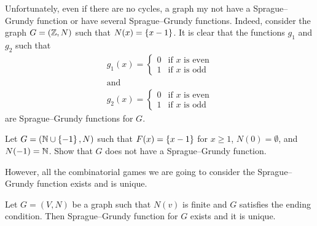Unfortunately, even if there are no cycles, a graph my not have a
Sprague--Grundy function or have several Sprague--Grundy functions. Indeed,
consider the graph $G = ({\mathbb{Z}}, N)$ such that $N(x) = \set{x - 1}$. It is clear
that the functions $g_1$ and $g_2$ such that
\begin{gather*}
    g_1(x) =
    \begin{cases}
        0 & \text{if } x \text{ is even} \\
        1 & \text{if } x \text{ is odd}
    \end{cases} \\
    \text{and} \\
    g_2(x) =
    \begin{cases}
        0 & \text{if } x \text{ is even} \\
        1 & \text{if } x \text{ is odd}
    \end{cases}
\end{gather*}
are Sprague--Grundy functions for $G$.

\begin{exercise}
    Let $G = (\N \cup \set{-1}, N)$ such that $F(x) = \set{x - 1}$ for $x \ge 1$,
    $N(0) = \emptyset$, and $N(-1) = {\mathbb{N}}$.
    Show that $G$ does not have a Sprague--Grundy function.
\end{exercise}

However, all the combinatorial games we are going to consider
the Sprague--Grundy function exists and is unique.
\begin{theorem}
\label{theorem:ending-condiction-sg-function}
  Let $G = (V, N)$ be a graph such that $N(v)$ is finite and $G$ satisfies the
  ending condition. Then Sprague--Grundy function for $G$ exists and it is
  unique.
\end{theorem}

